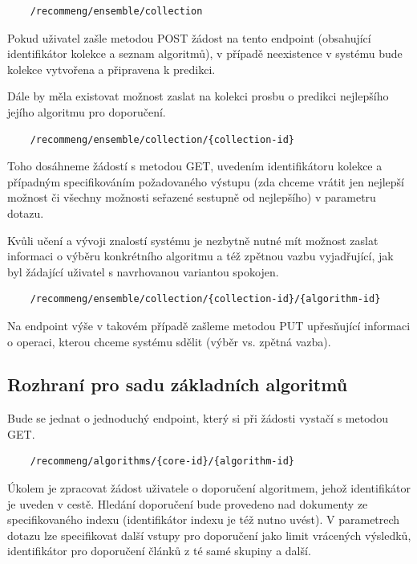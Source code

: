 \documentclass[thesis=M,czech]{FITthesis}[2014/05/07]
\begin{document}
\begin{verbatim}
	/recommeng/ensemble/collection
\end{verbatim}

Pokud uživatel zašle metodou POST žádost na tento endpoint (obsahující identifikátor kolekce a seznam algoritmů), v případě neexistence v systému bude kolekce vytvořena a připravena k predikci. 

Dále by měla existovat možnost zaslat na kolekci prosbu o predikci nejlepšího jejího algoritmu pro doporučení.

\begin{verbatim}
	/recommeng/ensemble/collection/{collection-id}
\end{verbatim}

Toho dosáhneme žádostí s metodou GET, uvedením identifikátoru kolekce a případným specifikováním požadovaného výstupu (zda chceme vrátit jen nejlepší možnost či všechny možnosti seřazené sestupně od nejlepšího) v parametru dotazu.

Kvůli učení a vývoji znalostí systému je nezbytně nutné mít možnost zaslat informaci o výběru konkrétního algoritmu a též zpětnou vazbu vyjadřující, jak byl žádající uživatel s navrhovanou variantou spokojen.

\begin{verbatim}
	/recommeng/ensemble/collection/{collection-id}/{algorithm-id}
\end{verbatim}

Na endpoint výše v takovém případě zašleme metodou PUT upřesňující informaci o operaci, kterou chceme systému sdělit (výběr vs. zpětná vazba).

\subsection{Rozhraní pro sadu základních algoritmů}

Bude se jednat o jednoduchý endpoint, který si při žádosti vystačí s metodou GET.

\begin{verbatim}
	/recommeng/algorithms/{core-id}/{algorithm-id}
\end{verbatim}

Úkolem je zpracovat žádost uživatele o doporučení algoritmem, jehož identifikátor je uveden v cestě. Hledání doporučení bude provedeno nad dokumenty ze specifikovaného indexu (identifikátor indexu je též nutno uvést). V parametrech dotazu lze specifikovat další vstupy pro doporučení jako limit vrácených výsledků, identifikátor pro doporučení článků z té samé skupiny a další.
\end{document}
